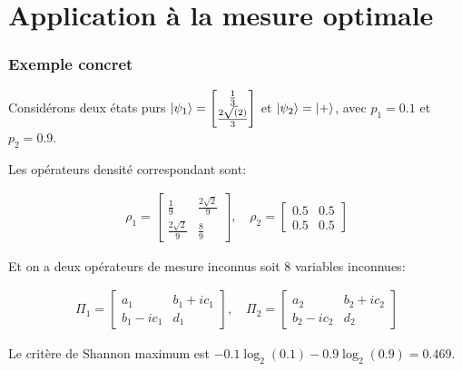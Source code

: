 \documentclass{beamer}
\begin{document}
\section[Application à la mesure optimale]{Application à la mesure optimale}
\begin{frame}
    \frametitle{Exemple concret}
    \tiny
    \begin{block}{}
        Considérons deux états purs $\ket{\psi_1} = \begin{bmatrix}\frac{1}{3} \\ \frac{2 \sqrt(2)}{3}\end{bmatrix}$ et $\ket{\psi_2} = \ket{+}$, avec $p_1 = 0.1$ et $p_2 = 0.9$.

        Les opérateurs densité correspondant sont:

        \begin{align}
            \rho_1 = \begin{bmatrix}
                \frac{1}{9} & \frac{2 \sqrt{2}}{9} \\ \frac{2 \sqrt{2}}{9} & \frac{8}{9}
            \end{bmatrix}, 
            \quad \rho_2 = \begin{bmatrix}
                0.5 & 0.5 \\ 0.5 & 0.5
            \end{bmatrix} \nonumber
        \end{align}

        \medbreak
        
        Et on a deux opérateurs de mesure inconnus soit 8 variables inconnues:

        \begin{align}
            \Pi_1 = \begin{bmatrix}
                a_1 & b_1 + ic_1 \\ b_1 - ic_1 & d_1
            \end{bmatrix}, \quad \Pi_2 = \begin{bmatrix}
                a_2 & b_2 + ic_2 \\ b_2 - ic_2 & d_2
            \end{bmatrix} \nonumber
        \end{align}

        Le critère de Shannon maximum est $-0.1\log_2(0.1) - 0.9\log_2(0.9) = 0.469.$ 

    \end{block}
\end{frame}
\end{document}
